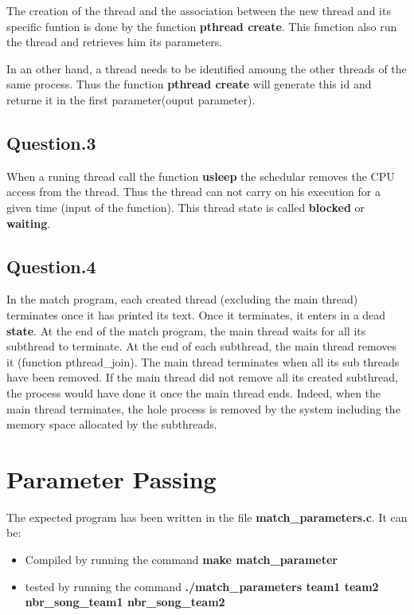 \documentclass[a4paper,10pt]{article}
\begin{document}
    The creation of the thread and the association between the new thread and its specific funtion is done by the function \textbf{pthread create}.   
    This function also run the thread and retrieves him its parameters.

    In an other hand, a thread needs to be identified amoung the other threads of the same process.  Thus the function \textbf{pthread create} will generate this id and returne it in the first parameter(ouput parameter).\newline
    
    
    \subsection{Question.3}
    When a runing thread call the function \textbf{usleep} the schedular removes the CPU access from the thread.  Thus the thread can not carry on his execution for a given time (input of the function).  This thread state is called \textbf{blocked} or \textbf{waiting}.

    \subsection{Question.4}
    In the match program, each created thread (excluding the main thread) terminates once it has printed its text.  Once it terminates, it enters in a dead \textbf{state}.\newline
    At the end of the match program, the main thread waits for all its subthread to terminate.  At the end of each subthread, the main thread removes it (function pthread\_join).   The main thread terminates when all its sub threads have been removed.\newline
    If the main thread did not remove all its created subthread, the process would have done it once the main thread ends.  Indeed, when the main thread terminates, the hole process is removed by the system including the memory space allocated by the subthreads.


\section{Parameter Passing}
    The expected program has been written in the file \textbf{match\_parameters.c}.  It can be:
    \begin{itemize}
     \item Compiled by running the command \textbf{make match\_parameter}
     \item tested by running the command \textbf{./match\_parameters team1 team2 nbr\_song\_team1 nbr\_song\_team2}
    \end{itemize}
\end{document}
